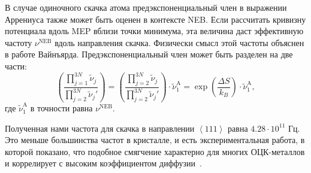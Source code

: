\documentclass[master,14pt,subf,href,colorlinks=true
]{disser}
\begin{document}
В случае одиночного скачка атома предэкспоненциальный член в выражении Аррениуса также может быть оценен в контексте NEB. Если рассчитать кривизну потенциала вдоль MEP вблизи точки минимума, эта величина даст эффективную частоту $\nu^\mathrm{NEB}$ вдоль направления скачка. Физически смысл этой частоты объяснен в работе Вайнъярда\cite{Vineyard}. Предэкспоненциальный член может быть разделен на две части:
\begin{equation}
	\left( \frac{\prod\limits_{j=1}^{3N} {\tilde{\nu}_j} } {\prod\limits_{j=2}^{3N} {\tilde{\nu}_j'} } \right) = 
	\left( \frac{\prod\limits_{j=2}^{3N} {\tilde{\nu}_j} } {\prod\limits_{j=2}^{3N} {\tilde{\nu}_j'} } \right) \cdot \tilde{\nu}^\mathrm{A}_1 = \exp{\left(\frac{\Delta S}{k_B}\right)}\cdot \tilde{\nu}^\mathrm{A}_1,
\end{equation}
где $\tilde{\nu}^\mathrm{A}_1$ в точности равна $\nu^\mathrm{NEB}$.

Полученная нами частота для скачка в направлении $\left\langle 111\right\rangle$ равна $4.28 \cdot 10^{11}$ Гц.
Это меньше большинства частот в кристалле, и есть экспериментальная работа, в которой показано, что подобное смягчение характерно для многих ОЦК-металлов и коррелирует с высоким коэффициентом диффузии~\cite{BCC_Soft_Phonons}.
\end{document}
